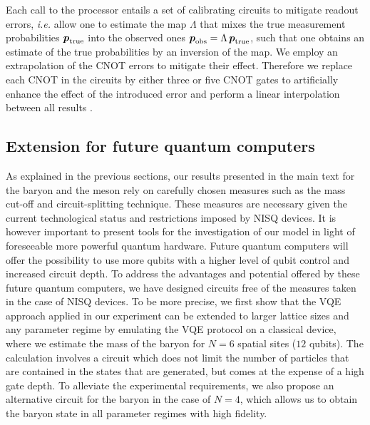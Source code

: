 \documentclass[twocolumn,aps,showpacs,prb,superscriptaddress,floatfix,10pt,nofootinbib]{revtex4-2}
\begin{document}
Each call to the processor entails a set of calibrating circuits to mitigate readout errors, \textit{i.e.} allow one to estimate the map $\Lambda$ that mixes the true measurement probabilities $\boldsymbol{p}_{\rm{true}}$ into the observed ones $\boldsymbol{p}_{\rm{obs}} = \Lambda\, \boldsymbol{p}_{\rm{true}}$, such that one obtains an estimate of the true probabilities by an inversion of the map. 
We employ an extrapolation of the CNOT errors to mitigate their effect. Therefore we replace each CNOT in the circuits by either three or five CNOT gates to artificially enhance the effect of the introduced error and perform a linear interpolation between all results \cite{Li2017Efficient}.

\subsection{Extension for future quantum computers}
\label{meth:extension}
As explained in the previous sections, our results presented in the main text for the baryon and the meson rely on carefully chosen measures such as the mass cut-off and circuit-splitting technique. These measures are necessary given the current technological status and restrictions imposed by NISQ devices. It is however important to present tools for the investigation of our model in light of foreseeable more powerful quantum hardware. Future quantum computers will offer the possibility to use more qubits with a higher level of qubit control and increased circuit depth. To address the advantages and potential offered by these future quantum computers, we have designed circuits free of the measures taken in the case of NISQ devices. To be more precise, we first show that the VQE approach applied in our experiment can  be extended to larger lattice sizes and any parameter regime by emulating the VQE protocol on a classical device, where we estimate the mass of the baryon for $N=6$ spatial sites ($12$ qubits). The calculation involves a circuit which does not limit the number of particles that are contained in the states that are generated, but comes at the expense of a high gate depth. To alleviate the experimental requirements, we also propose an alternative circuit for the baryon in the case of $N=4$, which allows us to obtain the baryon state in all parameter regimes with high fidelity.
\end{document}
